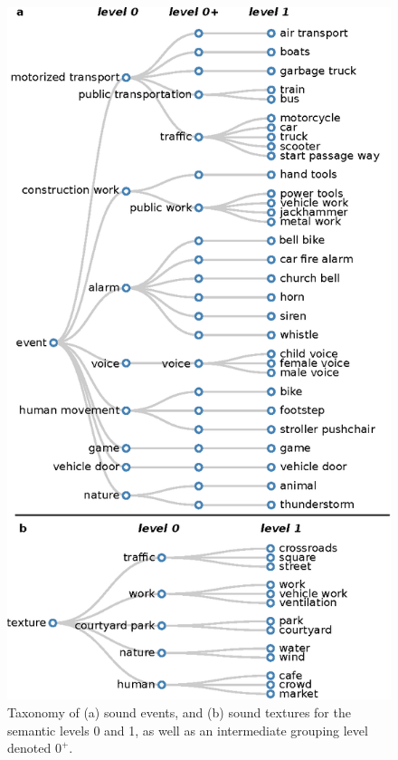 \documentclass[twoside,twocolumn]{article}
\begin{document}
\begin{figure}[t]
\begin{center}
\includegraphics[width=.4\paperwidth]{../gfxHierarchy/taxonomy.eps}
\caption{\label{fig:taxonomie} Taxonomy of (a) sound events, and (b) sound textures for the semantic levels 0 and 1, as well as an intermediate grouping level denoted $0^{+}$.}
\end{center}
\end{figure}
\end{document}
